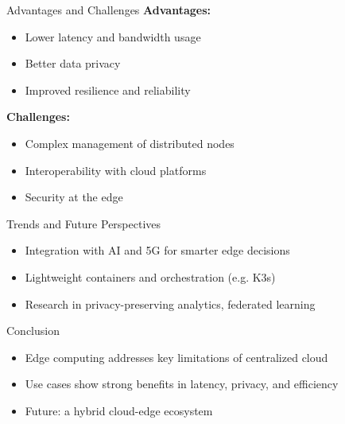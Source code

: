 \documentclass{beamer}
\begin{document}
\begin{frame}{Advantages and Challenges}
  \textbf{Advantages:}
  \begin{itemize}
    \item Lower latency and bandwidth usage
    \item Better data privacy
    \item Improved resilience and reliability
  \end{itemize}
  \vspace{0.3cm}
  \textbf{Challenges:}
  \begin{itemize}
    \item Complex management of distributed nodes
    \item Interoperability with cloud platforms
    \item Security at the edge
  \end{itemize}
\end{frame}

\begin{frame}{Trends and Future Perspectives}
  \begin{itemize}
    \item Integration with AI and 5G for smarter edge decisions
    \item Lightweight containers and orchestration (e.g. K3s)
    \item Research in privacy-preserving analytics, federated learning
  \end{itemize}
\end{frame}

\begin{frame}{Conclusion}
    \begin{itemize}
      \item Edge computing addresses key limitations of centralized cloud
      \item Use cases show strong benefits in latency, privacy, and efficiency
      \item Future: a hybrid cloud-edge ecosystem
    \end{itemize}
    
  \end{frame}
\end{document}
